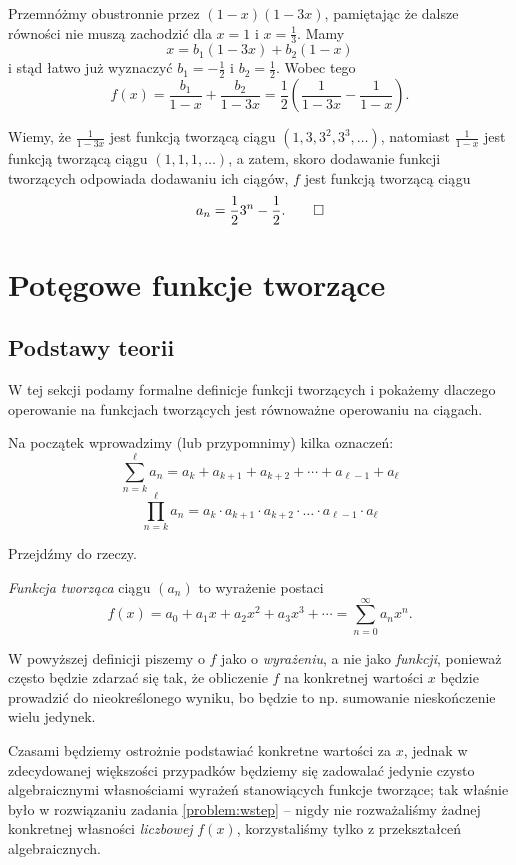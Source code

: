 \documentclass[shortabstract]{imthesis}
\begin{document}
\begin{solution}
Przemnóżmy obustronnie przez $(1-x)(1-3x)$, pamiętając że dalsze równości nie muszą zachodzić dla $x = 1$ i $x = \frac13$. Mamy
$$
x = b_1(1-3x) + b_2(1-x)
$$
i stąd łatwo już wyznaczyć $b_1 = -\frac12$ i $b_2 = \frac12$. Wobec tego
$$
f(x) = \frac{b_1}{1-x} + \frac{b_2}{1-3x} = \frac12\left(\frac{1}{1-3x} - \frac{1}{1-x}\right).
$$

Wiemy, że $\frac{1}{1-3x}$ jest funkcją tworzącą ciągu $(1, 3, 3^2, 3^3, \ldots)$, natomiast $\frac{1}{1-x}$ jest funkcją tworzącą ciągu $(1, 1, 1, \ldots)$, a zatem, skoro dodawanie funkcji tworzących odpowiada dodawaniu ich ciągów, $f$ jest funkcją tworzącą ciągu
$$
a_n = \frac12 3^n - \frac12.\qedhere
$$
\end{solution}

\chapter{Potęgowe funkcje tworzące}

\section{Podstawy teorii}

W tej sekcji podamy formalne definicje funkcji tworzących i pokażemy dlaczego operowanie na funkcjach tworzących jest równoważne operowaniu na ciągach.

Na początek wprowadzimy (lub przypomnimy) kilka oznaczeń:
$$
\sum_{n=k}^\ell a_n = a_k + a_{k+1} + a_{k+2} + \cdots + a_{\ell-1} + a_\ell
$$
$$
\prod_{n=k}^\ell a_n = a_k \cdot a_{k+1} \cdot a_{k+2} \cdot \ldots \cdot a_{\ell-1} \cdot a_\ell
$$

Przejdźmy do rzeczy.

\begin{definition}
    \emph{Funkcja tworząca} ciągu $(a_n)$ to wyrażenie postaci
    $$
    f(x) = a_0 + a_1x + a_2x^2 + a_3x^3 + \cdots = \sum_{n=0}^\infty a_nx^n.
    $$
\end{definition}

W powyższej definicji piszemy o $f$ jako o \emph{wyrażeniu}, a nie jako \emph{funkcji}, ponieważ często będzie zdarzać się tak, że obliczenie $f$ na konkretnej wartości $x$ będzie prowadzić do nieokreślonego wyniku, bo będzie to np. sumowanie nieskończenie wielu jedynek. 

Czasami będziemy ostrożnie podstawiać konkretne wartości za $x$, jednak w zdecydowanej większości przypadków będziemy się zadowalać jedynie czysto algebraicznymi własnościami wyrażeń stanowiących funkcje tworzące; tak właśnie było w rozwiązaniu zadania \ref{problem:wstep} -- nigdy nie rozważaliśmy żadnej konkretnej własności \emph{liczbowej} $f(x)$, korzystaliśmy tylko z przekształceń algebraicznych.
\end{document}
